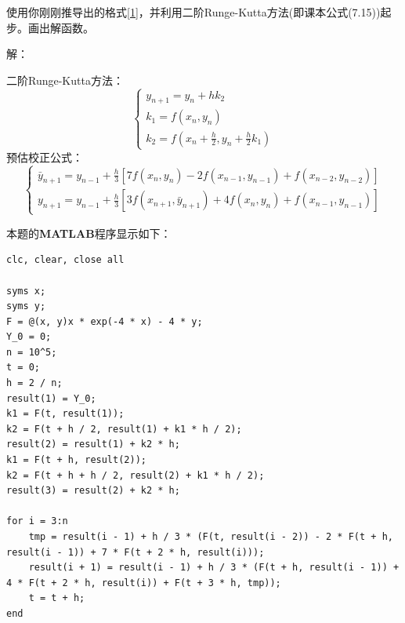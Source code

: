 \documentclass[12pt,a4paper,UTF8]{ctexart}
\theoremstyle{nonumberplain}
\begin{document}
\begin{enumerate}
\begin{enumerate}
                    使用你刚刚推导出的格式\ref{1}，并利用二阶Runge-Kutta方法(即课本公式(7.15))起 步。画出解函数。
                    \par 解：
                    \par 二阶Runge-Kutta方法：
                    $$
                        \left\{\begin{array}{l}
                            y_{n+1}=y_{n}+h k_{2}            \\
                            k_{1}=f\left(x_{n}, y_{n}\right) \\
                            k_{2}=f\left(x_{n}+\frac{h}{2}, y_{n}+\frac{h}{2} k_{1}\right)
                        \end{array}\right.
                    $$
                    预估校正公式：
                    $$
\left\{\begin{array}{l}
\bar{y}_{n+1}=y_{n-1}+\frac{h}{3}\left[7 f\left(x_{n}, y_{n}\right)-2 f\left(x_{n-1}, y_{n-1}\right)+f\left(x_{n-2}, y_{n-2}\right)\right] \\
y_{n+1}=y_{n-1}+\frac{h}{3}\left[3 f\left(x_{n+1}, \bar{y}_{n+1}\right)+4f\left(x_{n}, y_{n}\right)+ f\left(x_{n-1}, y_{n-1}\right)\right]
\end{array}\right.
$$
                    \par 本题的\textbf{MATLAB}程序显示如下：
                    \begin{lstlisting}[frame=single]
clc, clear, close all

syms x;
syms y;
F = @(x, y)x * exp(-4 * x) - 4 * y;
Y_0 = 0;
n = 10^5;
t = 0;
h = 2 / n;
result(1) = Y_0;
k1 = F(t, result(1));
k2 = F(t + h / 2, result(1) + k1 * h / 2);
result(2) = result(1) + k2 * h;
k1 = F(t + h, result(2));
k2 = F(t + h + h / 2, result(2) + k1 * h / 2);
result(3) = result(2) + k2 * h;

for i = 3:n
    tmp = result(i - 1) + h / 3 * (F(t, result(i - 2)) - 2 * F(t + h, result(i - 1)) + 7 * F(t + 2 * h, result(i)));
    result(i + 1) = result(i - 1) + h / 3 * (F(t + h, result(i - 1)) + 4 * F(t + 2 * h, result(i)) + F(t + 3 * h, tmp));
    t = t + h;
end


\end{lstlisting}
\end{enumerate}
\end{enumerate}
\end{document}
